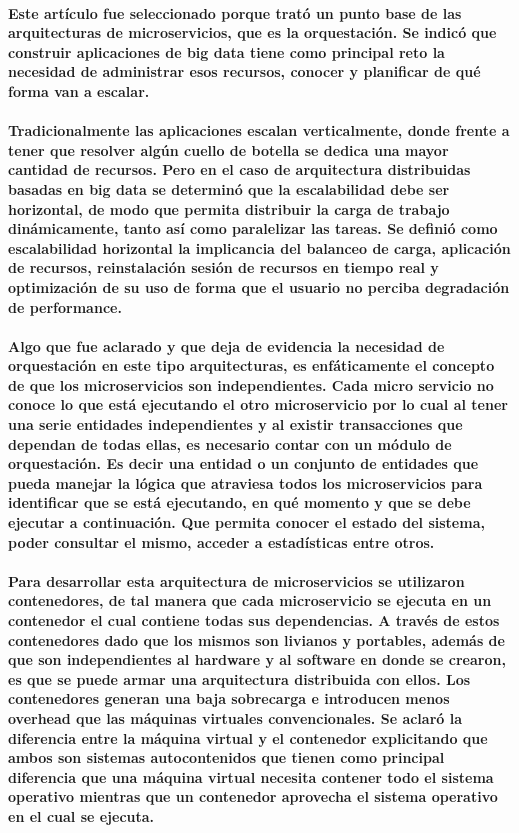 \paragraph{
    Este artículo fue seleccionado porque trató un punto base de las arquitecturas de microservicios, que es la orquestación. Se indicó que construir aplicaciones de big data tiene como principal reto la necesidad de administrar esos recursos, conocer y planificar de qué forma van a escalar.
}

\paragraph{
    Tradicionalmente las aplicaciones escalan verticalmente, donde frente a tener que resolver algún cuello de botella se dedica una mayor cantidad de recursos.
    Pero en el caso de arquitectura distribuidas basadas en big data se determinó que la escalabilidad debe ser horizontal, de modo que permita distribuir la carga de trabajo dinámicamente, tanto así como paralelizar las tareas.
    Se definió como escalabilidad horizontal la implicancia del balanceo de carga, aplicación de recursos, reinstalación sesión de recursos en tiempo real y optimización de su uso de forma que el usuario no perciba degradación de performance.
}

\paragraph{
    Algo que fue aclarado y que deja de evidencia la necesidad de orquestación en este tipo arquitecturas, es enfáticamente el concepto de que los microservicios son independientes.
    Cada micro servicio no conoce lo que está ejecutando el otro microservicio por lo cual al tener una serie entidades independientes y al existir transacciones que dependan de todas ellas, es necesario contar con un módulo de orquestación.
    Es decir una entidad o un conjunto de entidades que pueda manejar la lógica que atraviesa todos los microservicios para identificar que se está ejecutando, en qué momento y que se debe ejecutar a continuación.
    Que permita conocer el estado del sistema, poder consultar el mismo, acceder a estadísticas entre otros.
}

\paragraph{
    Para desarrollar esta arquitectura de microservicios se utilizaron contenedores, de tal manera que cada microservicio se ejecuta en un contenedor el cual contiene todas sus dependencias.
    A través de estos contenedores dado que los mismos son livianos y portables, además de que son independientes al hardware y al software en donde se crearon, es que se puede armar una arquitectura distribuida con ellos.
    Los contenedores generan una baja sobrecarga e introducen menos overhead que las máquinas virtuales convencionales.
    Se aclaró la diferencia entre la máquina virtual y el contenedor explicitando que ambos son sistemas autocontenidos que tienen como principal diferencia que una máquina virtual necesita contener todo el sistema operativo mientras que un contenedor aprovecha el sistema operativo en el cual se ejecuta.
}

